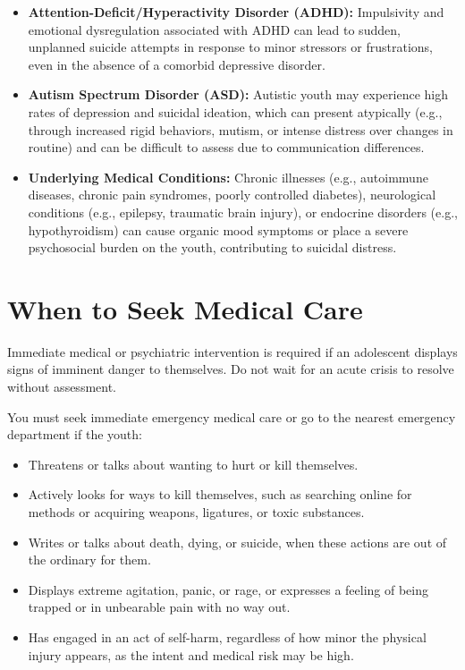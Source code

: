 \begin{itemize}
    \item \textbf{Attention-Deficit/Hyperactivity Disorder (ADHD):} Impulsivity and emotional dysregulation associated with ADHD can lead to sudden, unplanned suicide attempts in response to minor stressors or frustrations, even in the absence of a comorbid depressive disorder.
    \item \textbf{Autism Spectrum Disorder (ASD):} Autistic youth may experience high rates of depression and suicidal ideation, which can present atypically (e.g., through increased rigid behaviors, mutism, or intense distress over changes in routine) and can be difficult to assess due to communication differences.
    \item \textbf{Underlying Medical Conditions:} Chronic illnesses (e.g., autoimmune diseases, chronic pain syndromes, poorly controlled diabetes), neurological conditions (e.g., epilepsy, traumatic brain injury), or endocrine disorders (e.g., hypothyroidism) can cause organic mood symptoms or place a severe psychosocial burden on the youth, contributing to suicidal distress.
\end{itemize}

\section*{When to Seek Medical Care}
Immediate medical or psychiatric intervention is required if an adolescent displays signs of imminent danger to themselves. Do not wait for an acute crisis to resolve without assessment.

You must seek immediate emergency medical care or go to the nearest emergency department if the youth:
\begin{itemize}
    \item Threatens or talks about wanting to hurt or kill themselves.
    \item Actively looks for ways to kill themselves, such as searching online for methods or acquiring weapons, ligatures, or toxic substances.
    \item Writes or talks about death, dying, or suicide, when these actions are out of the ordinary for them.
    \item Displays extreme agitation, panic, or rage, or expresses a feeling of being trapped or in unbearable pain with no way out.
    \item Has engaged in an act of self-harm, regardless of how minor the physical injury appears, as the intent and medical risk may be high.
\end{itemize}

